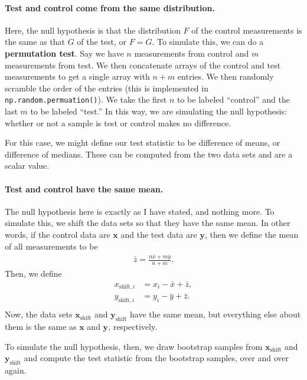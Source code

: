 \paragraph{Test and control come from the same distribution.} Here, the null hypothesis is that the distribution $F$ of the control measurements is the same as that $G$ of the test, or $F = G$. To simulate this, we can do a \textbf{permutation test}. Say we have $n$ measurements from control and $m$ measurements from test. We then concatenate arrays of the control and test measurements to get a single array with $n + m$ entries. We then randomly scramble the order of the entries (this is implemented in \texttt{np.random.permuation()}). We take the first $n$ to be labeled ``control'' and the last $m$ to be labeled ``test.'' In this way, we are simulating the null hypothesis: whether or not a sample is test or control makes no difference.

For this case, we might define our test statistic to be difference of means, or difference of medians. These can be computed from the two data sets and are a scalar value.

\paragraph{Test and control have the same mean.} The null hypothesis here is exactly as I have stated, and nothing more. To simulate this, we shift the data sets so that they have the same mean. In other words, if the control data are $\mathbf{x}$ and the test data are $\mathbf{y}$, then we define the mean of all measurements to be
\begin{align}
    \bar{z} = \frac{n\bar{x} + m\bar{y}}{n+m}.
\end{align}
Then, we define
\begin{align}
    x_{\mathrm{shift}, i} &= x_i - \bar{x} + \bar{z}, \\
    y_{\mathrm{shift}, i} &= y_i - \bar{y} + \bar{z}. \\
\end{align}
Now, the data sets $\mathbf{x}_\mathrm{shift}$ and $\mathbf{y}_\mathrm{shift}$ have the same mean, but everything else about them is the same as $\mathbf{x}$ and $\mathbf{y}$, respectively.

To simulate the null hypothesis, then, we draw bootstrap samples from $\mathbf{x}_\mathrm{shift}$ and $\mathbf{y}_\mathrm{shift}$ and compute the test statistic from the bootstrap samples, over and over again.

